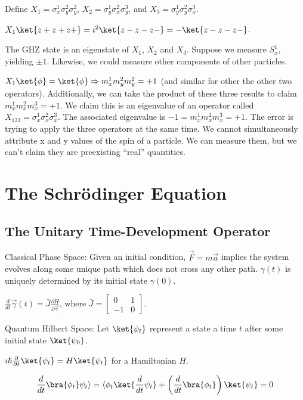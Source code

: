\documentclass[a4paper,twoside,master.tex]{subfiles}
\begin{document}
Define $X_1 = \sigma_x^1\sigma_y^2\sigma_y^2$,
$X_2 =\sigma_y^1\sigma_x^2\sigma_y^3$, and
$X_3 = \sigma_y^1\sigma_y^2\sigma_x^3$.

$X_1\ket{z+z+z+} = \imath^2\ket{z-z-z-} = -\ket{z-z-z-}$.

The GHZ state is an eigenstate of $X_1$, $X_2$ and $X_3$. Suppose
we measure $S_x^1$, yielding $\pm 1$. Likewise, we could measure
other components of other particles.

$X_1\ket{\phi} = \ket{\phi} \Rightarrow m_x^1m_y^2m_y^2 = +1$ (and
similar for other the other two operators). Additionally, we can take
the product of these three results to claim $m_x^1m_x^2m_x^3 = +1$. We
claim this is an eigenvalue of an operator called
$X_{123}=\sigma_x^1\sigma_x^2\sigma_x^3$. The associated eigenvalue is
$-1 = m_x^1m_x^2m_x^3 = +1$. The error is trying to apply the three
operators at the same time. We cannot simultaneously attribute x and y
values of the spin of a particle. We can measure them, but we can't
claim they are preexisting ``real'' quantities.


\chapter{The Schr\"odinger Equation}

\section{The Unitary Time-Development Operator}
\label{sec:the_unitary_time-development_operator}

Classical Phase Space: Given an initial condition, $\vec{F}=m\vec{a}$ implies the system evolves along some unique path which does not cross any other path. $\gamma(t)$ is uniquely determined by its initial state $\gamma(0)$.

$\frac{d}{dt}\vec{\gamma}(t) = \bar{J}\frac{\partial H}{\partial\vec{\gamma}}$, where $\bar{J} = \begin{bmatrix}0&1\\-1&0\end{bmatrix}$.

Quantum Hilbert Space: Let $\ket{\psi_t}$ represent a state a time $t$ after some initial state $\ket{\psi_0}$.

$\imath\hbar\frac{\partial}{\partial t}\ket{\psi_t} = H\ket{\psi_t} $ for a Hamiltonian $H$.

\begin{equation}
\frac{d}{dt}\bra{\phi_t}\psi_t\rangle = \langle\phi_t\ket{\frac{d}{dt}\psi_t} + \left(\frac{d}{dt}\bra{\phi_t}\right)\ket{\psi_t} = 0
\end{equation}
\end{document}
